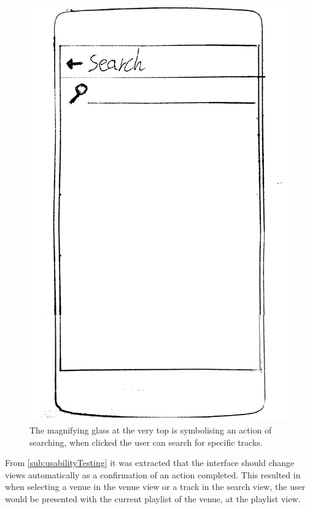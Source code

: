 \begin{figure}[hbtp]
  \centering
  \includegraphics[width=0.3\linewidth]{Images/sketch4.png}
  \caption[Search sketch.]{The magnifying glass at the very top is symbolising an action of searching, when clicked the user can search for specific tracks.}
  \label{fig:SearchSketch}
\end{figure}

From \cref{sub:usabilityTesting} it was extracted that the interface should change views automatically as a confirmation of an action completed. This resulted in when selecting a venue in the venue view or a track in the search view, the user would be presented with the current playlist of the venue, at the playlist view.
